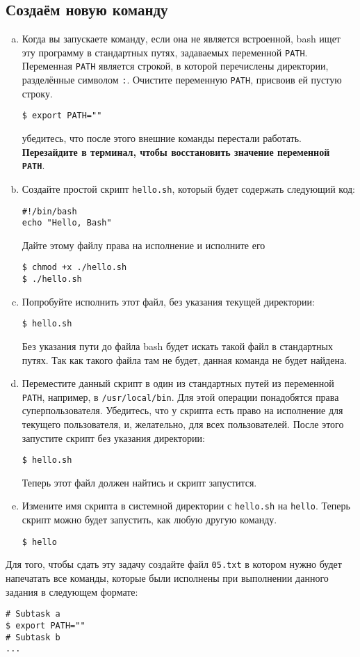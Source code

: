 \documentclass{article}
\begin{document}
\subsection{Создаём новую команду}
\begin{enumerate}[(a)]
\item Когда вы запускаете команду, если она не является встроенной, bash ищет эту программу в стандартных путях, задаваемых переменной \texttt{PATH}. Переменная \texttt{PATH} является строкой, в которой перечислены директории, разделённые символом \texttt{:}. Очистите переменную \texttt{PATH}, присвоив ей пустую строку.
\begin{lstlisting}
$ export PATH=""
\end{lstlisting}
убедитесь, что после этого внешние команды перестали работать. \textbf{Перезайдите в терминал, чтобы восстановить значение переменной \texttt{PATH}}.

\item Создайте простой скрипт \texttt{hello.sh}, который будет содержать следующий код:
\begin{lstlisting}
#!/bin/bash
echo "Hello, Bash"
\end{lstlisting}
Дайте этому файлу права на исполнение и исполните его
\begin{lstlisting}
$ chmod +x ./hello.sh
$ ./hello.sh
\end{lstlisting}

\item Попробуйте исполнить этот файл, без указания текущей директории:
\begin{lstlisting}
$ hello.sh
\end{lstlisting}
Без указания пути до файла bash будет искать такой файл в стандартных путях. Так как такого файла там не будет, данная команда не будет найдена.

\item Переместите данный скрипт в один из стандартных путей из переменной \texttt{PATH}, например, в \texttt{/usr/local/bin}. Для этой операции понадобятся права суперпользователя. Убедитесь, что у скрипта есть право на исполнение для текущего пользователя, и, желательно, для всех пользователей. После этого запустите скрипт без указания директории:
\begin{lstlisting}
$ hello.sh
\end{lstlisting}
Теперь этот файл должен найтись и скрипт запустится.

\item Измените имя скрипта в системной директории с \texttt{hello.sh} на \texttt{hello}. Теперь скрипт можно будет запустить, как любую другую команду.
\begin{lstlisting}
$ hello
\end{lstlisting}
\end{enumerate}
Для того, чтобы сдать эту задачу создайте файл \texttt{05.txt} в котором нужно будет напечатать все команды, которые были исполнены при выполнении данного задания в следующем формате:
\begin{lstlisting}
# Subtask a
$ export PATH=""
# Subtask b
...
\end{lstlisting}
\end{document}
